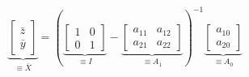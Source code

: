 \begin{equation}
\underbrace{
\begin{bmatrix}\bar{z} \\\bar{y}
\end{bmatrix}
}_{\equiv \bar{X}}
=
\left(
\underbrace{
\begin{bmatrix}1 & 0 \\0 & 1\end{bmatrix}
}_{\equiv I}
-
\underbrace{
\begin{bmatrix}a_{11} & a_{12} 
\\a_{21} & a_{22}\end{bmatrix}
}_{\equiv A_1}
\right)^{-1}
\underbrace{
\begin{bmatrix}a_{10} \\a_{20}\end{bmatrix}
}_{\equiv A_0}
\end{equation}
